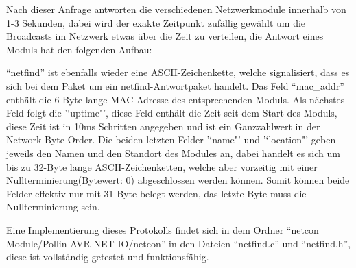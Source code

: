 \documentclass[a4paper,14pt,headsepline]{scrartcl}
\begin{document}
Nach dieser Anfrage antworten die verschiedenen Netzwerkmodule innerhalb von 1-3 Sekunden, dabei wird der exakte Zeitpunkt zufällig gewählt um die Broadcasts im Netzwerk etwas über die Zeit zu verteilen, die Antwort eines Moduls hat den folgenden Aufbau:
\begin{figure}[h]
\begin{center}
\end{center}
\end{figure}

"`netfind"' ist ebenfalls wieder eine ASCII-Zeichenkette, welche signalisiert, dass es sich bei dem Paket um ein netfind-Antwortpaket handelt. Das Feld "`mac\_addr"' enthält die 6-Byte lange MAC-Adresse des entsprechenden Moduls. Als nächstes Feld folgt die '`uptime"', diese Feld enthält die Zeit seit dem Start des Moduls, diese Zeit ist in 10ms Schritten angegeben und ist ein Ganzzahlwert in der Network Byte Order. Die beiden letzten Felder '`name"' und '`location"' geben jeweils den Namen und den Standort des Modules an, dabei handelt es sich um bis zu 32-Byte lange ASCII-Zeichenketten, welche aber vorzeitig mit einer Nullterminierung(Bytewert: 0) abgeschlossen werden können. Somit können beide Felder effektiv nur mit 31-Byte belegt werden, das letzte Byte muss die Nullterminierung sein.

Eine Implementierung dieses Protokolls findet sich in dem Ordner "`netcon Module/Pollin AVR-NET-IO/netcon"' in den Dateien "`netfind.c"' und "`netfind.h"', diese ist vollständig getestet und funktionsfähig.
\end{document}
